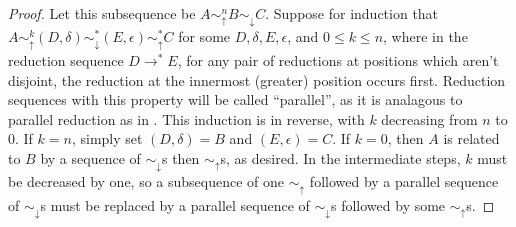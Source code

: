 \documentclass{article}
\theoremstyle{definition}
\theoremstyle{lemma}
\theoremstyle{remark}
\begin{document}
\begin{proof}
  Let this subsequence be $A \sim_\uparrow^n B \sim_\downarrow C$. Suppose for induction that $A \sim_\uparrow^k (D,\delta) \sim_\downarrow^* (E,\epsilon) \sim_\uparrow^* C$ for some $D, \delta, E, \epsilon$, and $0 \leq k \leq n$, where in the reduction sequence $D \to^* E$, for any pair of reductions at positions which aren't disjoint, the reduction at the innermost (greater) position occurs first. Reduction sequences with this property will be called ``parallel'', as it is analagous to parallel reduction as in . This induction is in reverse, with $k$ decreasing from $n$ to $0$. If $k = n$, simply set $(D,\delta) = B$ and $(E,\epsilon) = C$. If $k = 0$, then $A$ is related to $B$ by a sequence of $\sim_\downarrow$s then $\sim_\uparrow$s, as desired. In the intermediate steps, $k$ must be decreased by one, so a subsequence of one $\sim_\uparrow$ followed by a parallel sequence of $\sim_\downarrow$s must be replaced by a parallel sequence of $\sim_\downarrow$s followed by some $\sim_\uparrow$s.


\end{proof}
\end{document}

